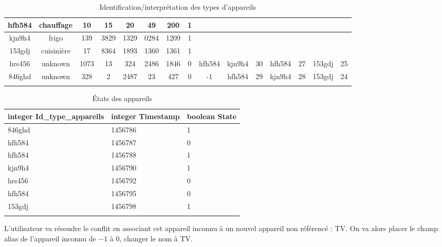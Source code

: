 \documentclass[10pt,a4paper]{article}
\begin{document}
\begin{table}[h]
{\begin{tabular}{|c|c|c|c|c|c|c|c|c|c|c|c|c|c|c|}
hfh584 & chauffage & 10 & 15 & 20 & 49 & 200 & 1 &  &  &  &  &  &  &  \\ \hline
kjn9h4 & frigo & 139 & 3829 & 1329 & 0284 & 1209 & 1 &  &  &  &  &  &  &  \\ \hline
153gdj & cuisinière & 17 & 8364 & 1893 & 1360 & 1361 & 1 &  &  &  &  &  &  &  \\ \hline
hrs456 & unknown & 1073 & 13 & 324 & 2486 & 1846 & 0 & hfh584 & kjn9h4 & 30 & hfh584 & 27 & 153gdj & 25 \\ \hline
846ghd & unknown & 328 & 2 & 2487 & 23 & 427 & 0 & -1 & hfh584 & 29 & kjn9h4 & 28 & 153gdj & 24 \\ \hline
 &  &  &  &  &  &  &  &  &  &  &  &  &  & 
\end{tabular}
}
\caption{Identification/interprétation des types d'appareils}
\end{table}

\begin{table}[h!]
\centering
    \begin{tabular}{|l|l|l|}
    \hline
    \rowcolor[HTML]{EFEFEF} 
    integer Id\_type\_appareils & integer Timestamp & boolean State \\ \hline
    846ghd       & 1456786           & 1             \\ \hline
    hfh584       & 1456787           & 0             \\ \hline
    hfh584       & 1456788           & 1             \\ \hline
    kjn9h4       & 1456790           & 1             \\ \hline
    hrs456       & 1456792           & 0             \\ \hline
    hfh584       & 1456795           & 0             \\ \hline
    153gdj       & 1456798           & 1             \\ \hline
                 &                   &              
    \end{tabular}
    \caption{États des appareils}
\end{table} 
\newpage
L'utilisateur va résoudre le conflit en associant cet appareil inconnu à un nouvel appareil non référencé : TV. On va alors placer le champ alias de l'appareil inconnu de $-1$ à $0$, changer le nom à TV.  

\newpage
\end{document}
